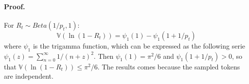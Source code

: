 \paragraph*{Proof.}
For $R_{t}\sim Beta(1/p_t, 1)$:
\begin{equation}
\mathbb{V}(\ln(1-R_t)) = \psi_1(1) - \psi_1(1+1/p_t)
\end{equation}
where $\psi_1$ is the trigamma function, which can be expressed as the following serie $\psi_1(z) = \sum_{n=0}^{\infty} 1/(n+z)^2$. 
Then $\psi_1(1) = \pi^2/6$ and $\psi_1(1+1/p_t)>0$, so that $\mathbb{V}(\ln(1-R_t)) \leq \pi^2/6$.
The results comes because the sampled tokens are independent. 

